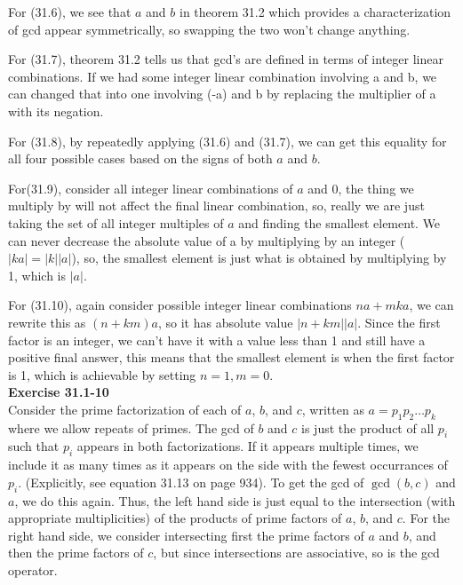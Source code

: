 \documentclass{article}
\begin{document}
For (31.6), we see that $a$ and $b$ in theorem 31.2 which provides a characterization of gcd appear symmetrically, so swapping the two won't change anything.

For (31.7), theorem 31.2 tells us that gcd's are defined in terms of integer linear combinations. If we had some integer linear combination involving a and b, we can changed that into one involving (-a) and b by replacing the multiplier of a with its negation.

For (31.8), by repeatedly applying (31.6) and (31.7), we can get this equality for all four possible cases based on the signs of both $a$ and $b$.

For(31.9), consider all integer linear combinations of $a$ and $0$, the thing we multiply  by will not affect the final linear combination, so, really we are just taking the set of all integer multiples of $a$ and finding the smallest element. We can never decrease the absolute value of a by multiplying by an integer ($|ka| = |k||a|$), so, the smallest element is just what is obtained by multiplying by 1, which is $|a|$.

For (31.10), again consider possible integer linear combinations $na + mka$, we can rewrite this as $(n+km)a$, so it has absolute value $|n+km||a|$. Since the first factor is an integer, we can't have it with a value less than 1 and still have a positive final answer, this means that the smallest element is when the first factor is 1, which is achievable by setting $n=1,m=0$.\\

\noindent\textbf{Exercise 31.1-10}\\

Consider the prime factorization of each of $a$, $b$, and $c$, written as $a = p_1p_2\ldots p_k$ where we allow repeats of primes.  The gcd of $b$ and $c$ is just the product of all $p_i$ such that $p_i$ appears in both factorizations.  If it appears multiple times, we include it as many times as it appears on the side with the fewest occurrances of $p_i$. (Explicitly, see equation 31.13 on page 934).  To get the gcd of $\gcd(b,c)$ and $a$, we do this again.  Thus, the left hand side is just equal to the intersection (with appropriate multiplicities) of the products of prime factors of $a$, $b$, and $c$.  For the right hand side, we consider intersecting first the prime factors of $a$ and $b$, and then the prime factors of $c$, but since intersections are associative, so is the gcd operator. \\
\end{document}
